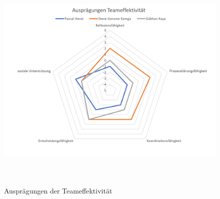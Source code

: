 \begin{figure}[!h]
  \centering
    \includegraphics[height=11cm]{images/AuspraegungenTeameffektivitaet.png}
  \caption{Ausprägungen der Teameffektivität}
  \label{fig:web}
\end{figure}

